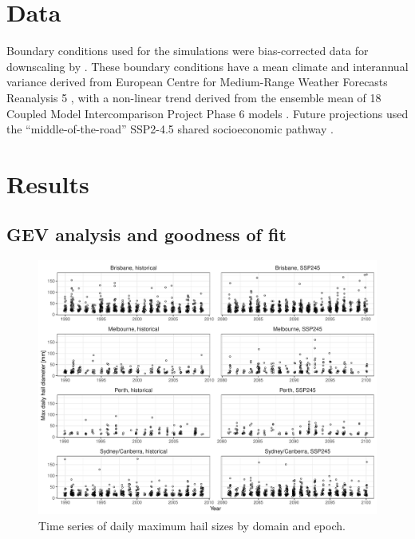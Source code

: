 \documentclass[]{agujournal2019}\usepackage[]{graphicx}\usepackage[]{xcolor}
\begin{document}
\section{Data}

Boundary conditions used for the simulations were bias-corrected data for downscaling by . These boundary conditions have a mean climate and interannual variance derived from European Centre for Medium-Range Weather Forecasts Reanalysis 5 \cite<ERA5,>{Hersbach_QJRMS_2020}, with a non-linear trend derived from the ensemble mean of 18 Coupled Model Intercomparison Project Phase 6 \cite<CMIP6,>{Eyring_GMD_2016} models \cite{Xu_SD_2021}. Future projections used the ``middle-of-the-road'' SSP2-4.5 shared socioeconomic pathway \cite<SSP,>{ONeill_GEC_2017}.

\section{Results}
\label{sec:results}

\subsection{GEV analysis and goodness of fit}

\begin{figure}[!ht]
      \includegraphics[width=\textwidth]{figures/timeseries_hail}
      \caption{Time series of daily maximum hail sizes by domain and epoch.}
      \label{fig:timeseries_hail}
\end{figure}
\end{document}
